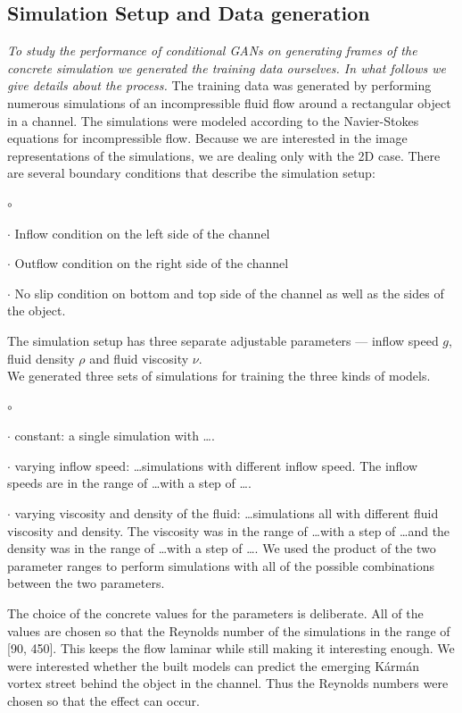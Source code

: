 \documentclass{llncs}
\begin{document}
\subsection{Simulation Setup and Data generation}
\emph{To study the performance of conditional GANs on generating frames of the concrete simulation we generated the training data ourselves. In what follows we give details about the process.} The training data was generated by performing numerous simulations of an incompressible fluid flow around a rectangular object in a channel. The simulations were modeled according to the Navier-Stokes equations for incompressible flow. Because we are interested in the image representations of the simulations, we are dealing only with the 2D case. There are several boundary conditions that describe the simulation setup:
\begin{list}{$\circ$}{}
\item[$\cdot$] Inflow condition on the left side of the channel
\item[$\cdot$] Outflow condition on the right side of the channel
\item[$\cdot$] No slip condition on bottom and top side of the channel as well as the sides of the object.
\end{list}
The simulation setup has three separate adjustable parameters --- inflow speed $g$, fluid density $\rho$ and fluid viscosity $\nu$.
\\
We generated three sets of simulations for training the three kinds of models.
\begin{list}{$\circ$}{}
\item[$\cdot$] constant: a single simulation with \ldots.
\item[$\cdot$] varying inflow speed: \ldots simulations with different inflow speed. The inflow speeds are in the range of \ldots with a step of \ldots.
\item[$\cdot$] varying viscosity and density of the fluid: \ldots simulations all with different fluid viscosity and density. The viscosity was in the range of \ldots with a step of \ldots and the density was in the range of \ldots with a step of \ldots. We used the product of the two parameter ranges to perform simulations with all of the possible combinations between the two parameters.
\end{list}

The choice of the concrete values for the parameters is deliberate. All of the values are chosen so that the Reynolds number of the simulations in the range of [90, 450]. This keeps the flow laminar while still making it interesting enough. We were interested whether the built models can predict the emerging Kármán vortex street behind the object in the channel. Thus the Reynolds numbers were chosen so that the effect can occur.
\end{document}
